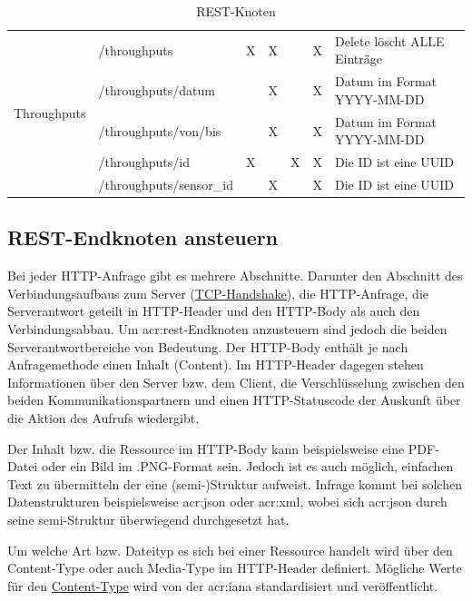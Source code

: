 \begin{landscape}
\begin{table}[H]
\begin{longtable}{lllllll}
      \multirow{5}{*}{Throughputs}    & /throughputs                  & X & X & & X & Delete löscht ALLE Einträge   \\
                                      & /throughputs/{datum}          &  & X & & X & Datum im Format YYYY-MM-DD     \\
                                      & /throughputs/{von}/{bis}      &  & X & & X & Datum im Format YYYY-MM-DD     \\
                                      & /throughputs/{id}             & X & & X & X & Die ID ist eine UUID          \\
                                      & /throughputs/{sensor\_id}     &  & X & & X & Die ID ist eine UUID           \\ \midrule
    \end{longtable}
    \caption{REST-Knoten}%
    \label{tbl:rest-knoten}
  \end{table}
\end{landscape}

\subsection{REST-Endknoten ansteuern}%
\label{sec:rest.ansteuern}
Bei jeder HTTP-Anfrage gibt es mehrere Abschnitte. Darunter den Abschnitt des Verbindungsaufbaus zum Server (\href{http://www.rvs.uni-bielefeld.de/~heiko/tcpip/tcpip_html_alt/kap_2_4.html}{TCP-Handshake}), die HTTP-Anfrage, die Serverantwort geteilt in HTTP-Header und den HTTP-Body als auch den Verbindungsabbau. Um \acrshort{acr:rest}-Endknoten anzusteuern sind jedoch die beiden Serverantwortbereiche von Bedeutung. Der HTTP-Body enthält je nach Anfragemethode einen Inhalt (Content). Im HTTP-Header dagegen stehen Informationen über den Server bzw. dem Client, die Verschlüsselung zwischen den beiden Kommunikationspartnern und einen HTTP-Statuscode der Auskunft über die Aktion des Aufrufs wiedergibt.

Der Inhalt bzw. die Ressource im HTTP-Body kann beispielsweise eine PDF-Datei oder ein Bild im .PNG-Format sein. Jedoch ist es auch möglich, einfachen Text zu übermitteln der eine (semi-)Struktur aufweist. Infrage kommt bei solchen Datenstrukturen beispielsweise \acrfull{acr:json} oder \acrfull{acr:xml}, wobei sich \acrshort{acr:json} durch seine semi-Struktur überwiegend durchgesetzt hat.

Um welche Art bzw. Dateityp es sich bei einer Ressource handelt wird über den Content-Type oder auch Media-Type im HTTP-Header definiert. Mögliche Werte für den \href{http://www.iana.org/assignments/media-types/media-types.xhtml}{Content-Type} wird von der \acrfull{acr:iana} standardisiert und veröffentlicht.

